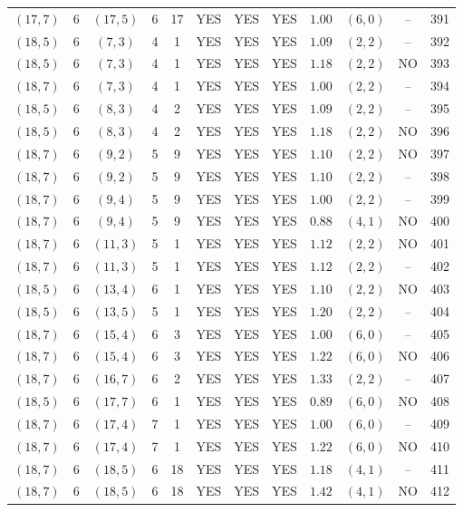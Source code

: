 \begin{longtable}{|c|c|c|c|c|c|c|c|c|c|c|c|}
$(17,7)$ & 6 & $(17,5)$ & 6 & 17 & YES & YES & YES & $1.00$ & $(6,0)$ & -- & 391\\
$(18,5)$ & 6 & $(7,3)$ & 4 & 1 & YES & YES & YES & $1.09$ & $(2,2)$ & -- & 392\\
$(18,5)$ & 6 & $(7,3)$ & 4 & 1 & YES & YES & YES & $1.18$ & $(2,2)$ & NO & 393\\
$(18,7)$ & 6 & $(7,3)$ & 4 & 1 & YES & YES & YES & $1.00$ & $(2,2)$ & -- & 394\\
$(18,5)$ & 6 & $(8,3)$ & 4 & 2 & YES & YES & YES & $1.09$ & $(2,2)$ & -- & 395\\
$(18,5)$ & 6 & $(8,3)$ & 4 & 2 & YES & YES & YES & $1.18$ & $(2,2)$ & NO & 396\\
$(18,7)$ & 6 & $(9,2)$ & 5 & 9 & YES & YES & YES & $1.10$ & $(2,2)$ & NO & 397\\
$(18,7)$ & 6 & $(9,2)$ & 5 & 9 & YES & YES & YES & $1.10$ & $(2,2)$ & -- & 398\\
$(18,7)$ & 6 & $(9,4)$ & 5 & 9 & YES & YES & YES & $1.00$ & $(2,2)$ & -- & 399\\
$(18,7)$ & 6 & $(9,4)$ & 5 & 9 & YES & YES & YES & $0.88$ & $(4,1)$ & NO & 400\\
$(18,7)$ & 6 & $(11,3)$ & 5 & 1 & YES & YES & YES & $1.12$ & $(2,2)$ & NO & 401\\
$(18,7)$ & 6 & $(11,3)$ & 5 & 1 & YES & YES & YES & $1.12$ & $(2,2)$ & -- & 402\\
$(18,5)$ & 6 & $(13,4)$ & 6 & 1 & YES & YES & YES & $1.10$ & $(2,2)$ & NO & 403\\
$(18,5)$ & 6 & $(13,5)$ & 5 & 1 & YES & YES & YES & $1.20$ & $(2,2)$ & -- & 404\\
$(18,7)$ & 6 & $(15,4)$ & 6 & 3 & YES & YES & YES & $1.00$ & $(6,0)$ & -- & 405\\
$(18,7)$ & 6 & $(15,4)$ & 6 & 3 & YES & YES & YES & $1.22$ & $(6,0)$ & NO & 406\\
$(18,7)$ & 6 & $(16,7)$ & 6 & 2 & YES & YES & YES & $1.33$ & $(2,2)$ & -- & 407\\
$(18,5)$ & 6 & $(17,7)$ & 6 & 1 & YES & YES & YES & $0.89$ & $(6,0)$ & NO & 408\\
$(18,7)$ & 6 & $(17,4)$ & 7 & 1 & YES & YES & YES & $1.00$ & $(6,0)$ & -- & 409\\
$(18,7)$ & 6 & $(17,4)$ & 7 & 1 & YES & YES & YES & $1.22$ & $(6,0)$ & NO & 410\\
$(18,7)$ & 6 & $(18,5)$ & 6 & 18 & YES & YES & YES & $1.18$ & $(4,1)$ & -- & 411\\
$(18,7)$ & 6 & $(18,5)$ & 6 & 18 & YES & YES & YES & $1.42$ & $(4,1)$ & NO & 412\\

\end{longtable}
